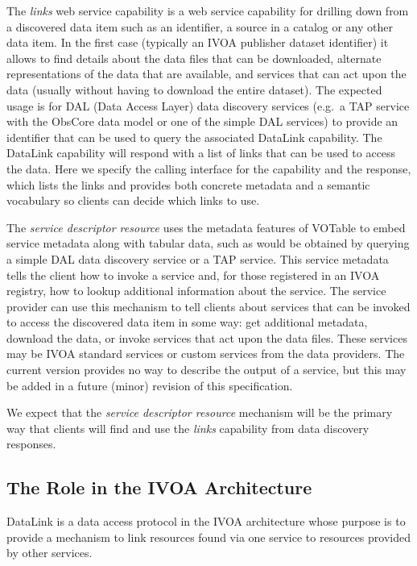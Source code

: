 \documentclass[11pt,a4paper]{ivoa}
\begin{document}
The {\em links\/} web service capability is a web service capability
for drilling
down from a discovered data item such as an identifier,
a source in a catalog or any other data item. In the first case
(typically an IVOA publisher dataset identifier) it allows
to find details about the data files that can be
downloaded, alternate representations of the data that are available, and
services that can act upon the data (usually without having to download
the entire dataset). The expected usage is for DAL (Data Access Layer)
data discovery services (e.g.\ a TAP service \citep{2010ivoa.spec.0327D}
with the ObsCore \citep{2017ivoa.spec.0509L} data
model or one of the simple DAL services) to provide an identifier that
can be used to query the associated DataLink capability. The DataLink
capability will respond with a list of links that can be used to access
the data. Here we specify the calling interface for the capability and
the response, which lists the links and provides both concrete metadata
and a semantic vocabulary so clients can decide which links to use.

The {\em service descriptor resource\/}
uses the metadata features of VOTable to
embed service metadata along with tabular data, such as would be obtained
by querying a simple DAL data discovery service or a TAP service. This
service metadata tells the client how to invoke a service and, for those
registered in an IVOA registry, how to lookup additional information
about the service. The service provider can use this mechanism to tell
clients about services that can be invoked to access the discovered
data item in some way: get additional metadata, download the data, or
invoke services that act upon the data files. These services may be
IVOA standard services or custom services from the data providers. The
current version provides no way to describe the output of a service,
but this may be added in a future (minor) revision of this specification.

We expect that the {\em service descriptor resource\/}
mechanism will be the primary way that clients will find and
use the {\em links\/} capability from data discovery
responses.


\subsection{The Role in the IVOA Architecture}

DataLink is a data access protocol in the IVOA architecture whose purpose
is to provide a mechanism to link resources found via one service to
resources provided by other services.
\end{document}
